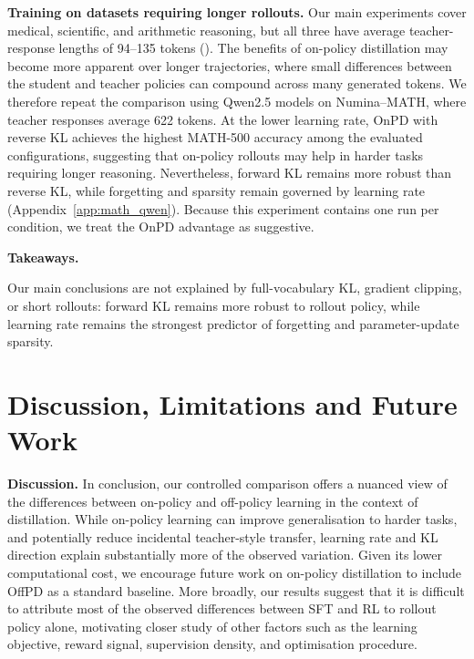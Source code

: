 \documentclass{article} %
\theoremstyle{plain}
\theoremstyle{definition}
\theoremstyle{remark}
\newenvironment{highlight}[1][Takeaways]
{%
\begin{tcolorbox}[
    enhanced,
    breakable,
    frame hidden,
    colback=takeawayblue!5,
    borderline west={2pt}{0pt}{takeawayblue},
    boxsep=0pt,
    left=2.5mm,
    right=2.5mm,
    top=2mm,
    bottom=2mm
]
\noindent
\textcolor{takeawayblue}{%
    \faLightbulb\hspace{0.4em}\textbf{#1.}\hspace{0.5em}%
}\hspace{0.35em}\ignorespaces
}
{%
\unskip
\end{tcolorbox}
}
\begin{document}
\textbf{Training on datasets requiring longer rollouts.} Our main experiments cover medical, scientific, and arithmetic reasoning, but all three have average teacher-response lengths of 94--135 tokens (). The benefits of on-policy distillation may become more apparent over longer trajectories, where small differences between the student and teacher policies can compound across many generated tokens. We therefore repeat the comparison using Qwen2.5 models on Numina--MATH, where teacher responses average 622 tokens. At the lower learning rate, OnPD with reverse KL achieves the highest MATH-500 accuracy among the evaluated configurations, suggesting that on-policy rollouts may help in harder tasks requiring longer reasoning. Nevertheless, forward KL remains more robust than reverse KL, while forgetting and sparsity remain governed by learning rate (Appendix~\ref{app:math_qwen}). Because this experiment contains one run per condition, we treat the OnPD advantage as suggestive.

\begin{highlight}
Our main conclusions are not explained by full-vocabulary KL, gradient clipping, or short rollouts: forward KL remains more robust to rollout policy, while learning rate remains the strongest predictor of forgetting and parameter-update sparsity.
\end{highlight}



\section{Discussion, Limitations and Future Work}

\textbf{Discussion.} In conclusion, our controlled comparison offers a nuanced view of the differences between on-policy and off-policy learning in the context of distillation. While on-policy learning can improve generalisation to harder tasks, and potentially reduce incidental teacher-style transfer, learning rate and KL direction explain substantially more of the observed variation. Given its lower computational cost, we encourage future work on on-policy distillation to include OffPD as a standard baseline. More broadly, our results suggest that it is difficult to attribute most of the observed differences between SFT and RL to rollout policy alone, motivating closer study of other factors such as the learning objective, reward signal, supervision density, and optimisation procedure.
\end{document}
